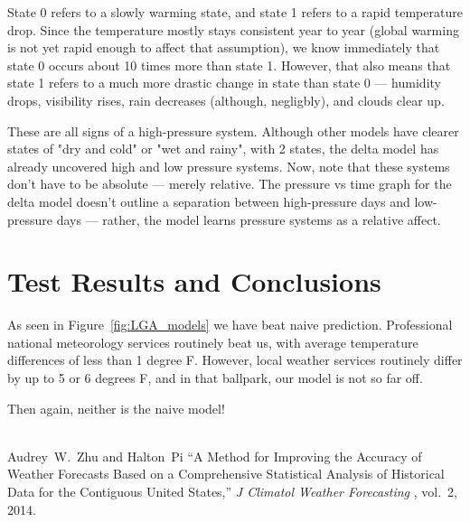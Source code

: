 \documentclass[a4paper]{article}
\begin{document}
State 0 refers to a slowly warming state, and state 1 refers to a rapid temperature drop. Since the temperature mostly stays consistent year to year (global warming is not yet rapid enough to affect that assumption), we know immediately that state 0 occurs about 10 times more than state 1. However, that also means that state 1 refers to a much more drastic change in state than state 0 --- humidity drops, visibility rises, rain decreases (although, negligbly), and clouds clear up.

These are all signs of a high-pressure system. Although other models have clearer states of "dry and cold" or "wet and rainy", with 2 states, the delta model has already uncovered high and low pressure systems. Now, note that these systems don't have to be absolute --- merely relative. The pressure vs time graph for the delta model doesn't outline a separation between high-pressure days and low-pressure days --- rather, the model learns pressure systems as a relative affect.



\section{Test Results and Conclusions}
As seen in Figure~\ref{fig:LGA_models} we have beat naive prediction. Professional national meteorology services routinely beat us, with average temperature differences of less than 1 degree F. However, local weather services routinely differ by up to 5 or 6 degrees F, and in that ballpark, our model is not so far off. 

Then again, neither is the naive model!
\\
\qquad
\\
\qquad




























\begin{thebibliography}{9}
  Audrey\ W.\ Zhu and Halton\ Pi
  ``A Method for Improving the Accuracy of Weather Forecasts Based on a Comprehensive Statistical Analysis of Historical Data for the Contiguous United States,''
  \textit{ J Climatol Weather Forecasting }, vol.~2, 2014.
\end{thebibliography}
\end{document}
